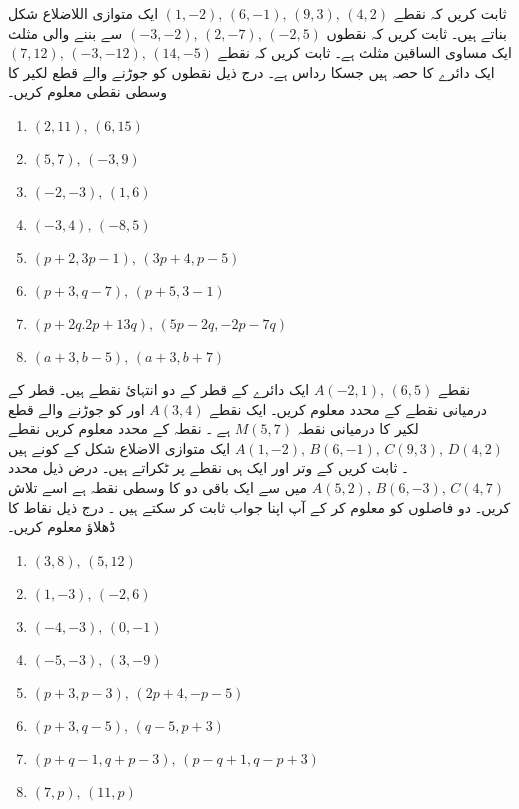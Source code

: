 ثابت کریں کہ نقطے \( (1,-2), \, (6,-1), \, (9,3), \, (4,2) \) ایک متوازی اللاضلاع شکل بناتے ہیں۔
ثابت کریں کہ نقطوں \( (-3,-2), \, (2,-7), \, (-2,5) \) سے بننے والی مثلث ایک مساوی الساقین مثلث ہے۔
ثابت کریں کہ نقطے \( (7,12), \, (-3,-12), \, (14,-5)\)  ایک دائرے کا حصہ ہیں جسکا رداس   ہے۔
درج ذیل نقطوں کو جوڑنے والے قطع لکیر کا وسطی نقطی معلوم کریں۔
\begin{multicols}{2}
\begin{enumerate}[.a]
\item \( (2,11), \, (6,15) \)
\item \( (5,7), \, (-3,9) \)
\item \( (-2,-3), \, (1,6) \)
\item \( (-3,4) , \, (-8,5) \)
\item \( (p+2, 3p-1), \, (3p+4,p-5) \)
\item \( (p+3,q-7), \, (p+5,3-1) \)
\item \( (p+2q.2p+13q), \, (5p-2q,-2p-7q) \)
\item \( (a+3,b-5), \, (a+3,b+7) \)
\end{enumerate}
\end{multicols}
نقطے \( A(-2,1) , \, (6,5) \) ایک دائرے کے قطر کے دو انتہائ نقطے ہیں۔ قطر کے درمیانی نقطے کے محدد معلوم کریں۔ 
ایک نقطے \(A(3,4)\) اور  کو جوڑنے والے قطع لکیر کا درمیانی نقطہ  \(M(5,7)\)       ہے ۔ نقطہ      کے محدد معلوم کریں
نقطے \( A(1,-2), \, B(6,-1), \, C(9,3), \, D(4,2) \) ایک متوازی الاضلاع شکل کے کونے ہیں ۔ ثابت کریں کے وتر اور     ایک ہی نقطے پر ٹکراتے ہیں۔
درض ذیل محدد \( A(5,2), \, B(6,-3), \, C(4,7) \) میں سے ایک باقی دو کا وسطی نقطہ ہے اسے تلاش کریں۔ دو فاصلوں کو معلوم کر کے آپ اپنا جواب ثابت کر سکتے ہیں ۔
%
درج ذیل نقاط کا ڈھلاؤ معلوم کریں۔
\begin{multicols}{2}
\begin{enumerate}[.a]
\item \( (3,8), \, (5,12) \)
\item \( (1,-3), \, (-2,6) \)
\item \( (-4,-3), \, (0,-1) \)
\item \( (-5,-3), \, (3,-9) \)
\item \( (p+3, p-3), \, (2p+4,-p-5) \)
\item \( (p+3,q-5), \, (q-5, p+3) \)
\item \( (p+q-1, q+p-3), \, (p-q+1, q-p+3) \)
\item \( (7,p), \, ( 11,p) \)
\end{enumerate}
\end{multicols}
